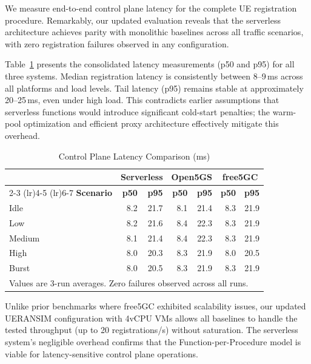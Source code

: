 We measure end-to-end control plane latency for the complete UE registration procedure. Remarkably, our updated evaluation reveals that the serverless architecture achieves parity with monolithic baselines across all traffic scenarios, with zero registration failures observed in any configuration.

Table~\ref{tab:latency-comparison} presents the consolidated latency measurements (p50 and p95) for all three systems. Median registration latency is consistently between 8--9\,ms across all platforms and load levels. Tail latency (p95) remains stable at approximately 20--25\,ms, even under high load. This contradicts earlier assumptions that serverless functions would introduce significant cold-start penalties; the warm-pool optimization and efficient proxy architecture effectively mitigate this overhead.

\begin{table}[t]
\centering
\caption{Control Plane Latency Comparison (ms)}
\label{tab:latency-comparison}
\footnotesize
\begin{tabular}{@{}l rr rr rr@{}}
\toprule
 & \multicolumn{2}{c}{\textbf{Serverless}} & \multicolumn{2}{c}{\textbf{Open5GS}} & \multicolumn{2}{c}{\textbf{free5GC}} \\
\cmidrule(lr){2-3} \cmidrule(lr){4-5} \cmidrule(lr){6-7}
\textbf{Scenario} & \textbf{p50} & \textbf{p95} & \textbf{p50} & \textbf{p95} & \textbf{p50} & \textbf{p95} \\
\midrule
Idle   & 8.2 & 21.7 & 8.1 & 21.4 & 8.3 & 21.9 \\
Low    & 8.2 & 21.6 & 8.4 & 22.3 & 8.3 & 21.9 \\
Medium & 8.1 & 21.4 & 8.4 & 22.3 & 8.3 & 21.9 \\
High   & 8.0 & 20.3 & 8.3 & 21.9 & 8.0 & 20.5 \\
Burst  & 8.0 & 20.5 & 8.3 & 21.9 & 8.3 & 21.9 \\
\bottomrule
\multicolumn{7}{l}{\scriptsize Values are 3-run averages. Zero failures observed across all runs.}
\end{tabular}
\end{table}

Unlike prior benchmarks where free5GC exhibited scalability issues, our updated UERANSIM configuration with 4vCPU VMs allows all baselines to handle the tested throughput (up to 20 registrations/s) without saturation. The serverless system's negligible overhead confirms that the Function-per-Procedure model is viable for latency-sensitive control plane operations.

